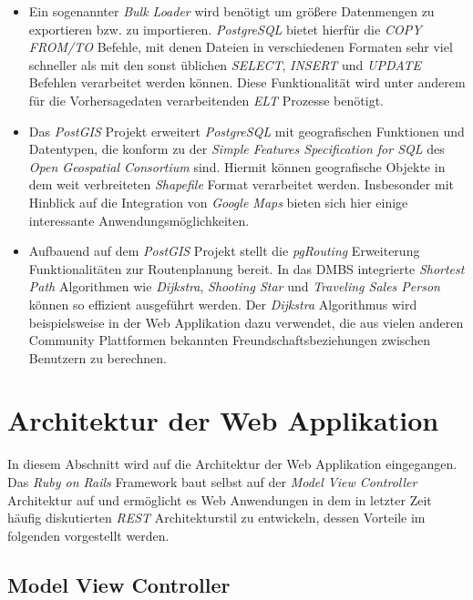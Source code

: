\begin{itemize}
\item Ein sogenannter \textit{Bulk Loader} wird benötigt um größere
  Datenmengen zu exportieren bzw. zu importieren. \textit{PostgreSQL}
  bietet hierfür die \textit{COPY FROM/TO} Befehle, mit denen Dateien
  in verschiedenen Formaten sehr viel schneller als mit den sonst
  üblichen \textit{SELECT}, \textit{INSERT} und \textit{UPDATE}
  Befehlen verarbeitet werden können. Diese Funktionalität wird unter
  anderem für die Vorhersagedaten verarbeitenden \textit{ELT} Prozesse
  benötigt.

\item Das \textit{PostGIS} Projekt erweitert \textit{PostgreSQL} mit
  geografischen Funktionen und Datentypen, die konform zu der
  \textit{Simple Features Specification for SQL} des \textit{Open
    Geospatial Consortium} sind. Hiermit können geografische Objekte
  in dem weit verbreiteten \textit{Shapefile} Format verarbeitet
  werden. Insbesonder mit Hinblick auf die Integration von
  \textit{Google Maps} bieten sich hier einige interessante
  Anwendungsmöglichkeiten.

\item Aufbauend auf dem \textit{PostGIS} Projekt stellt die
  \textit{pgRouting} Erweiterung Funktionalitäten zur Routenplanung
  bereit. In das DMBS integrierte \textit{Shortest Path} Algorithmen
  wie \textit{Dijkstra}, \textit{Shooting Star} und \textit{Traveling
    Sales Person} können so effizient ausgeführt werden. Der
  \textit{Dijkstra} Algorithmus wird beispielsweise in der Web
  Applikation dazu verwendet, die aus vielen anderen Community
  Plattformen bekannten Freundschaftsbeziehungen zwischen Benutzern zu
  berechnen.

\end{itemize}

\section{Architektur der Web Applikation}
In diesem Abschnitt wird auf die Architektur der Web Applikation
eingegangen. Das \textit{Ruby on Rails} Framework baut selbst auf der
\textit{Model View Controller} Architektur auf und ermöglicht es Web
Anwendungen in dem in letzter Zeit häufig diskutierten \textit{REST}
Architekturstil zu entwickeln, dessen Vorteile im folgenden
vorgestellt werden.

\subsection{Model View Controller}
\label{Model View Controller}


